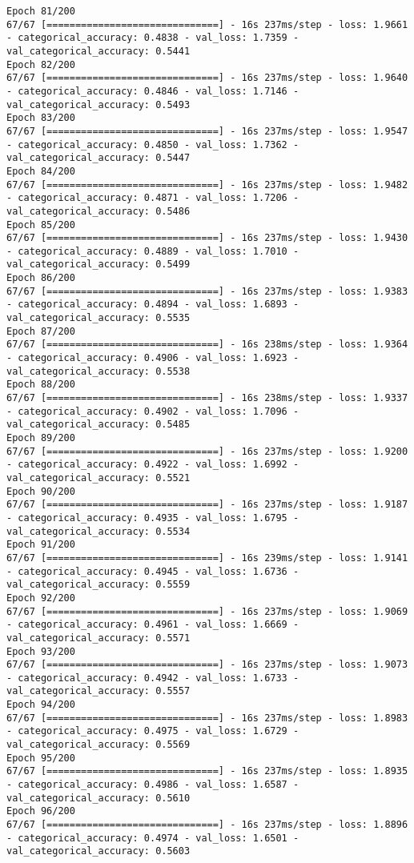 \begin{lstlisting}
Epoch 81/200
67/67 [==============================] - 16s 237ms/step - loss: 1.9661 - categorical_accuracy: 0.4838 - val_loss: 1.7359 - val_categorical_accuracy: 0.5441
Epoch 82/200
67/67 [==============================] - 16s 237ms/step - loss: 1.9640 - categorical_accuracy: 0.4846 - val_loss: 1.7146 - val_categorical_accuracy: 0.5493
Epoch 83/200
67/67 [==============================] - 16s 237ms/step - loss: 1.9547 - categorical_accuracy: 0.4850 - val_loss: 1.7362 - val_categorical_accuracy: 0.5447
Epoch 84/200
67/67 [==============================] - 16s 237ms/step - loss: 1.9482 - categorical_accuracy: 0.4871 - val_loss: 1.7206 - val_categorical_accuracy: 0.5486
Epoch 85/200
67/67 [==============================] - 16s 237ms/step - loss: 1.9430 - categorical_accuracy: 0.4889 - val_loss: 1.7010 - val_categorical_accuracy: 0.5499
Epoch 86/200
67/67 [==============================] - 16s 237ms/step - loss: 1.9383 - categorical_accuracy: 0.4894 - val_loss: 1.6893 - val_categorical_accuracy: 0.5535
Epoch 87/200
67/67 [==============================] - 16s 238ms/step - loss: 1.9364 - categorical_accuracy: 0.4906 - val_loss: 1.6923 - val_categorical_accuracy: 0.5538
Epoch 88/200
67/67 [==============================] - 16s 238ms/step - loss: 1.9337 - categorical_accuracy: 0.4902 - val_loss: 1.7096 - val_categorical_accuracy: 0.5485
Epoch 89/200
67/67 [==============================] - 16s 237ms/step - loss: 1.9200 - categorical_accuracy: 0.4922 - val_loss: 1.6992 - val_categorical_accuracy: 0.5521
Epoch 90/200
67/67 [==============================] - 16s 237ms/step - loss: 1.9187 - categorical_accuracy: 0.4935 - val_loss: 1.6795 - val_categorical_accuracy: 0.5534
Epoch 91/200
67/67 [==============================] - 16s 239ms/step - loss: 1.9141 - categorical_accuracy: 0.4945 - val_loss: 1.6736 - val_categorical_accuracy: 0.5559
Epoch 92/200
67/67 [==============================] - 16s 237ms/step - loss: 1.9069 - categorical_accuracy: 0.4961 - val_loss: 1.6669 - val_categorical_accuracy: 0.5571
Epoch 93/200
67/67 [==============================] - 16s 237ms/step - loss: 1.9073 - categorical_accuracy: 0.4942 - val_loss: 1.6733 - val_categorical_accuracy: 0.5557
Epoch 94/200
67/67 [==============================] - 16s 237ms/step - loss: 1.8983 - categorical_accuracy: 0.4975 - val_loss: 1.6729 - val_categorical_accuracy: 0.5569
Epoch 95/200
67/67 [==============================] - 16s 237ms/step - loss: 1.8935 - categorical_accuracy: 0.4986 - val_loss: 1.6587 - val_categorical_accuracy: 0.5610
Epoch 96/200
67/67 [==============================] - 16s 237ms/step - loss: 1.8896 - categorical_accuracy: 0.4974 - val_loss: 1.6501 - val_categorical_accuracy: 0.5603

\end{lstlisting}
